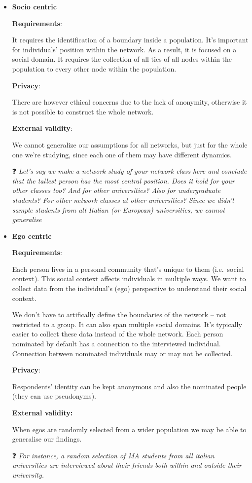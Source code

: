 \documentclass[
  notitlepage,
  onecolumn,
  openany]{book}
\begin{document}
\begin{itemize}
\item
  \textbf{Socio centric}

  \textbf{Requirements}:

  It requires the identification of a boundary inside a population. It's important for individuals' position within the network. As a result, it is focused on a social domain. It requires the collection of all ties of all nodes within the population to every other node within the population.

  \textbf{Privacy}:

  There are however ethical concerns due to the lack of anonymity, otherwise it is not possible to construct the whole network.

  \textbf{External validity}:

  We cannot generalize our assumptions for all networks, but just for the whole one we're studying, since each one of them may have different dynamics.

  ❓ \emph{Let's say we make a network study of your network class here and conclude that the tallest person has the most central position. Does it hold for your other classes too? And for other universities? Also for undergraduate students? For other network classes at other universities? Since we didn't sample students from all Italian (or European) universities, we cannot generalise}
\item
  \textbf{Ego centric}

  \textbf{Requirements}:

  Each person lives in a personal community that's unique to them (i.e.~social context). This social context affects individuals in multiple ways. We want to collect data from the individual's (ego) perspective to understand their social context.

  We don't have to artifically define the boundaries of the network -- not restricted to a group. It can also span multiple social domains. It's typically easier to collect these data instead of the whole network. Each person nominated by default has a connection to the interviewed individual. Connection between nominated individuals may or may not be collected.

  \textbf{Privacy}:

  Respondents' identity can be kept anonymous and also the nominated people (they can use pseudonyms).

  \textbf{External validity:}

  When egos are randomly selected from a wider population we may be able to generalise our findings.

  ❓ \emph{For instance, a random selection of MA students from all italian universities are interviewed about their friends both within and outside their university.}
\end{itemize}
\end{document}
